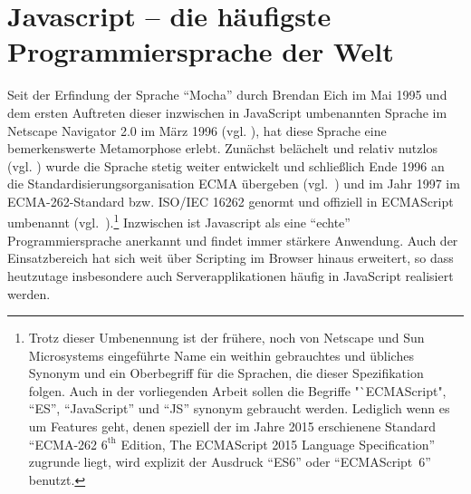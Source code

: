 \documentclass[
11pt, %
a4paper, %
oneside, %
pdfspacing, %
headinclude,
BCOR5mm, %
ngerman, %
bibtotocnumbered,
]{scrartcl}
\begin{document}
{\let\thefootnote\relax{}}

\cleardoublepage

\tableofcontents %

\listoffigures %

\listoftables %

\lstlistoflistings




\cleardoublepage %

\setcounter{page}{1}
\section{Javascript -- die häufigste Programmiersprache der Welt}


Seit der Erfindung der Sprache "`Mocha"' durch Brendan Eich im Mai 1995 und dem ersten Auftreten dieser inzwischen in JavaScript umbenannten Sprache im Netscape Navigator 2.0 im März 1996 (vgl. \citep{NetscapeSun1995}), hat diese Sprache eine bemerkenswerte Metamorphose erlebt. Zunächst belächelt und relativ nutzlos (vgl. \citep{Buckler2016}) wurde die Sprache stetig weiter entwickelt und schließlich Ende 1996 an die Standardisierungsorganisation ECMA übergeben (vgl.~\citep{NetscapePressRelease.1996})
und im Jahr 1997 im ECMA-262-Standard bzw. ISO/IEC 16262 genormt und offiziell in ECMAScript umbenannt (vgl.~\citep{EcmaTC39.1997}).\footnote{Trotz dieser Umbenennung ist der frühere, noch von Netscape und Sun Microsystems eingeführte Name ein weithin gebrauchtes und übliches Synonym und ein Oberbegriff für die Sprachen, die dieser Spezifikation folgen. Auch in der vorliegenden Arbeit sollen die Begriffe "`ECMAScript", "`ES"', "`JavaScript"' und "`JS"' synonym gebraucht werden. Lediglich wenn es um Features geht, denen speziell der im Jahre 2015 erschienene Standard "`ECMA-262 $6^{\mathrm{th}}$ Edition, The ECMAScript 2015 Language Specification"' zugrunde liegt, wird explizit der Ausdruck "`ES6"' oder "`ECMAScript~6"' benutzt.}
Inzwischen ist Javascript als eine "`echte"' Programmiersprache anerkannt und findet immer stärkere Anwendung. Auch der Einsatzbereich hat sich weit über Scripting im Browser hinaus erweitert, so dass heutzutage insbesondere auch Serverapplikationen häufig in JavaScript realisiert werden.  
\end{document}

